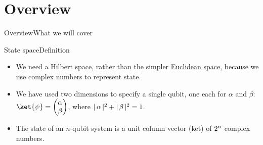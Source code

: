 
\section{Overview}
\begin{frame}{Overview}{What we will cover}
    
\end{frame}

\begin{frame}{State space}{Definition}
\begin{itemize}
    \item We need a Hilbert space, rather than the simpler \href{https://en.wikipedia.org/wiki/Euclidean_space}{Euclidean space}, because we use complex numbers to represent state.
    \item We have used two dimensions to specify a single qubit, one each for $\alpha$ and $\beta$: $\ket{\psi}=\SQB{\alpha}{\beta}$, where
    $|\,\alpha\,|^{2}+|\,\beta\,|^{2}=1$.
  
    \item The state of an $n$-qubit system is a unit column vector (ket)  of $2^{n}$ complex numbers.
\end{itemize}
\end{frame}

